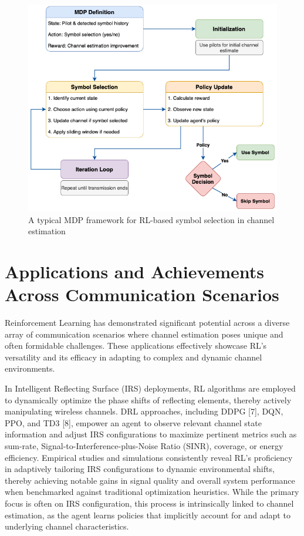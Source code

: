 \documentclass[journal,twocolumn]{IEEEtran}
\begin{document}
\begin{figure}[!t]
\centering
\includegraphics[width=0.9\columnwidth]{fig_symbol_selection_mdp.png}
\caption{A typical MDP framework for RL-based symbol selection in channel estimation}
\label{fig:symbol_selection_mdp}
\end{figure}

\section{Applications and Achievements Across Communication Scenarios}

Reinforcement Learning has demonstrated significant potential across a diverse array of communication scenarios where channel estimation poses unique and often formidable challenges. These applications effectively showcase RL's versatility and its efficacy in adapting to complex and dynamic channel environments.

In Intelligent Reflecting Surface (IRS) deployments, RL algorithms are employed to dynamically optimize the phase shifts of reflecting elements, thereby actively manipulating wireless channels. DRL approaches, including DDPG [7], DQN, PPO, and TD3 [8], empower an agent to observe relevant channel state information and adjust IRS configurations to maximize pertinent metrics such as sum-rate, Signal-to-Interference-plus-Noise Ratio (SINR), coverage, or energy efficiency. Empirical studies and simulations consistently reveal RL's proficiency in adaptively tailoring IRS configurations to dynamic environmental shifts, thereby achieving notable gains in signal quality and overall system performance when benchmarked against traditional optimization heuristics. While the primary focus is often on IRS configuration, this process is intrinsically linked to channel estimation, as the agent learns policies that implicitly account for and adapt to underlying channel characteristics.
\end{document}
